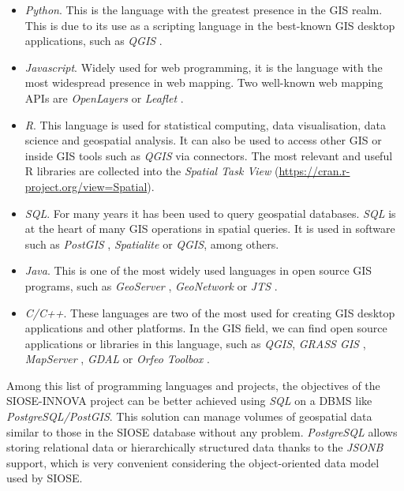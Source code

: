 \documentclass[ijgi,article,submit,moreauthors,pdftex]{Definitions/mdpi}
\begin{document}
\begin{itemize}
\item \textit{Python}. This is the language with the greatest presence in the GIS realm. This is due to its use as a scripting language in the best-known GIS desktop applications, such as \textit{QGIS} \cite{qgis2015qgis}.
\item \textit{Javascript}. Widely used for web programming, it is the language with the most widespread presence in web mapping. Two well-known web mapping APIs are \textit{OpenLayers} \cite{hazzard2011openlayers} or \textit{Leaflet} \cite{leafletjs}.
\item \textit{R}. This language is used for statistical computing, data visualisation, data science and geospatial analysis. It can also be used to access other GIS or inside GIS tools such as \textit{QGIS} via connectors. The most relevant and useful R libraries are collected into the \textit{Spatial Task View} (\url{https://cran.r-project.org/view=Spatial}).
\item \textit{SQL}. For many years it has been used to query geospatial databases. \textit{SQL} is at the heart of many GIS operations in spatial queries. It is used in software such as \textit{PostGIS} \cite{postgis}, \textit{Spatialite} or \textit{QGIS}, among others.
\item \textit{Java}. This is one of the most widely used languages in open source GIS programs, such as \textit{GeoServer} \cite{geoserver}, \textit{GeoNetwork} \cite{geonetwork} or \textit{JTS} \cite{solutions2003jts}.
\item \textit{C/C++}. These languages are two of the most used for creating GIS desktop applications and other platforms. In the GIS field, we can find open source applications or libraries in this language, such as \textit{QGIS}, \textit{GRASS GIS} \cite{neteler2012grass}, \textit{MapServer} \cite{mapserver}, \textit{GDAL} \cite{gdal} or \textit{Orfeo Toolbox} \cite{orfeo}.
\end{itemize}

Among this list of programming languages and projects, the objectives of the SIOSE-INNOVA project can be better achieved using \textit{SQL} on a DBMS like \textit{PostgreSQL/PostGIS}. This solution can manage volumes of geospatial data similar to those in the SIOSE database without any problem. \textit{PostgreSQL} allows storing relational data or hierarchically structured data thanks to the \textit{JSONB} support, which is very convenient considering the object-oriented data model used by SIOSE.
\end{document}
